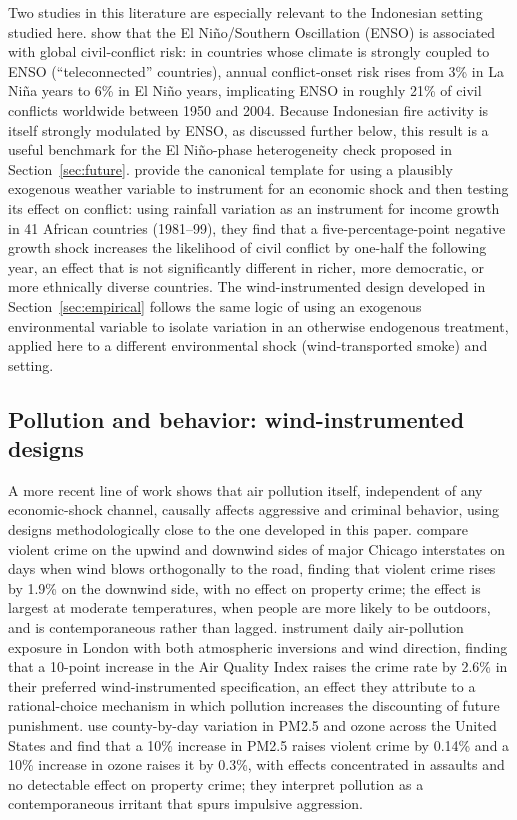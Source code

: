 \documentclass[12pt]{article}
\begin{document}
Two studies in this literature are especially relevant to the Indonesian setting studied here. \citet{hsiangmengcane2011} show that the El Ni\~{n}o/Southern Oscillation (ENSO) is associated with global civil-conflict risk: in countries whose climate is strongly coupled to ENSO (``teleconnected'' countries), annual conflict-onset risk rises from 3\% in La Ni\~{n}a years to 6\% in El Ni\~{n}o years, implicating ENSO in roughly 21\% of civil conflicts worldwide between 1950 and 2004. Because Indonesian fire activity is itself strongly modulated by ENSO, as discussed further below, this result is a useful benchmark for the El Ni\~{n}o-phase heterogeneity check proposed in Section~\ref{sec:future}. \citet{miguelsatyanathsergenti2004} provide the canonical template for using a plausibly exogenous weather variable to instrument for an economic shock and then testing its effect on conflict: using rainfall variation as an instrument for income growth in 41 African countries (1981--99), they find that a five-percentage-point negative growth shock increases the likelihood of civil conflict by one-half the following year, an effect that is not significantly different in richer, more democratic, or more ethnically diverse countries. The wind-instrumented design developed in Section~\ref{sec:empirical} follows the same logic of using an exogenous environmental variable to isolate variation in an otherwise endogenous treatment, applied here to a different environmental shock (wind-transported smoke) and setting.

\subsection{Pollution and behavior: wind-instrumented designs}

A more recent line of work shows that air pollution itself, independent of any economic-shock channel, causally affects aggressive and criminal behavior, using designs methodologically close to the one developed in this paper. \citet{herrnstadt2021} compare violent crime on the upwind and downwind sides of major Chicago interstates on days when wind blows orthogonally to the road, finding that violent crime rises by 1.9\% on the downwind side, with no effect on property crime; the effect is largest at moderate temperatures, when people are more likely to be outdoors, and is contemporaneous rather than lagged. \citet{bondyrothsager2020} instrument daily air-pollution exposure in London with both atmospheric inversions and wind direction, finding that a 10-point increase in the Air Quality Index raises the crime rate by 2.6\% in their preferred wind-instrumented specification, an effect they attribute to a rational-choice mechanism in which pollution increases the discounting of future punishment. \citet{burkhardt2019} use county-by-day variation in PM2.5 and ozone across the United States and find that a 10\% increase in PM2.5 raises violent crime by 0.14\% and a 10\% increase in ozone raises it by 0.3\%, with effects concentrated in assaults and no detectable effect on property crime; they interpret pollution as a contemporaneous irritant that spurs impulsive aggression.
\end{document}
